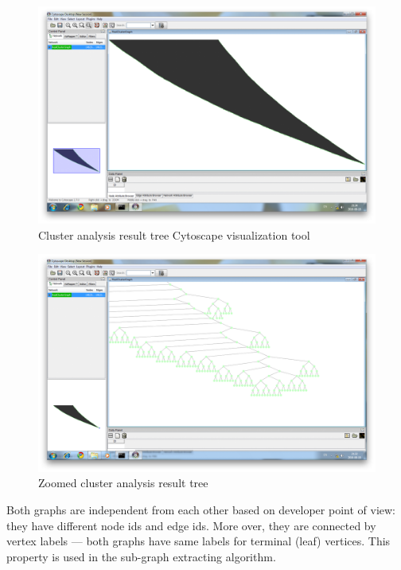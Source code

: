 \begin{figure}[h!]
\centering
\includegraphics[scale=0.25]{pictures/Cytoscape_cluster_graph_1.png}
\caption{Cluster analysis result tree Cytoscape visualization tool}
\label{fig:Cytoscape_Cluster_1}
\end{figure}

\begin{figure}[h!]
\centering
\includegraphics[scale=0.25]{pictures/Cytoscape_cluster_graph_2.png}
\caption{Zoomed cluster analysis result tree}
\label{fig:Cytoscape_Cluster_2}
\end{figure}

Both graphs are independent from each other based on developer point of view: they have different node ids and edge ids. More over, they are connected by vertex labels ---
both graphs have same labels for terminal (leaf) vertices. This property is used in the sub-graph extracting algorithm.


